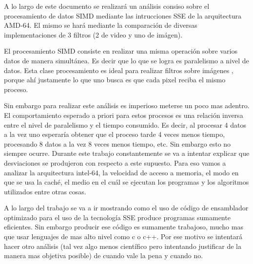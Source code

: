 

	A lo largo de este documento se realizará un análisis consiso sobre el
procesamiento de datos SIMD mediante las intrucciones SSE de la arquitectura
AMD-64. El mismo se hará mediante la comparación de diversas implementaciones
de 3 filtros (2 de video y uno de imágen).

	El procesamiento SIMD consiste en realizar una misma operación sobre varios
datos de manera simultánea. Es decir que lo que se logra es paralelismo a nivel
de datos. Esta clase procesamiento es ideal para realizar filtros sobre imágenes
, porque ahí justamente lo que uno busca es que cada pixel reciba el mismo proceso.

	

	Sin embargo para realizar este análisis es imperioso meterse un poco mas adentro.
El comportamiento esperado a priori para estos procesos es una relación inversa entre
el nivel de paralelismo y el tiempo consumido. Es decir, al procesar 4 datos a la vez
uno esperaría obtener que el proceso tarde 4 veces menos tiempo, procesando 8 datos
a la vez 8 veces menos tiempo, etc. Sin embargo esto no siempre ocurre. Durante
este trabajo constantemente se va a intentar explicar que desviaciones se 
produjeron con respecto a este supuesto. Para eso vamos a analizar la arquitectura
intel-64, la velocidad de acceso a memoria, el modo en que se usa la caché,
el medio en el cuál se ejecutan los programas y los algoritmos utilizados entre
otras cosas.

	A lo largo del trabajo se va a ir mostrando como el uso de código de ensamblador
optimizado para el uso de la tecnología SSE produce programas sumamente eficientes. Sin embargo
producir ese código es sumamente trabajoso, mucho mas que usar lenguajes de mas alto nivel como
c o c++. Por ese motivo se intentará hacer otro análisis (tal vez algo menos científico
pero intentando justificar de la manera mas objetiva posible) de cuando vale la pena y cuando no.





	
